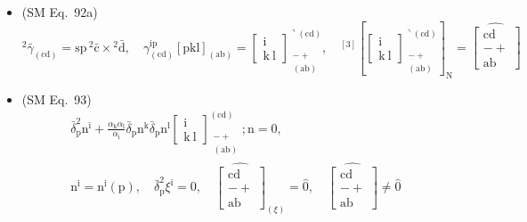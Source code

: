 \documentclass[12pt]{article}
\begin{document}
\begin{itemize}[label={},leftmargin=0pt]
    \item (SM Eq.\ 92a) 
    \[
    {}^2\bar{\gamma}_{(\mathrm{cd})} = \mathrm{sp}\,{}^2\bar{\mathrm{c}} \times {}^2\bar{\mathrm{d}}, \quad \gamma_{(\mathrm{cd})}^{\mathrm{ip}}\left[\mathrm{pkl}\right]_{(\mathrm{ab})} = \left[ \begin{smallmatrix} \mathrm{i} \\ \mathrm{k\ l} \end{smallmatrix} \right]^{\urcorner(\mathrm{cd})}_{\substack{- + \\ (\mathrm{ab})}}, \quad {}^{[3]}\left[ \left[ \begin{smallmatrix} \mathrm{i} \\ \mathrm{k\ l} \end{smallmatrix} \right]^{\urcorner(\mathrm{cd})}_{\substack{- + \\ (\mathrm{ab})}} \right]_\mathrm{N} = \widehat{\left[ \begin{smallmatrix} \mathrm{cd} \\ - + \\ \mathrm{ab} \end{smallmatrix} \right]}
    \]

    \item (SM Eq.\ 93) 
    \[
    \begin{gathered}
    \bar{\delta}_\mathrm{p}^2 \mathrm{n^i} + \frac{\alpha_\mathrm{k} \alpha_\mathrm{l}}{\alpha_\mathrm{i}} \bar{\delta}_\mathrm{p} \mathrm{n^k} \bar{\delta}_\mathrm{p} \mathrm{n^l} \left[ \begin{smallmatrix} \mathrm{i} \\ \mathrm{k\ l} \end{smallmatrix} \right]^{(\mathrm{cd})}_{\substack{- + \\ (\mathrm{ab})}} ; \mathrm{n} = 0, \\
    \mathrm{n^i} = \mathrm{n^i}(\mathrm{p}), \quad \bar{\delta}_\mathrm{p}^2 \xi^\mathrm{i} = 0, \quad \widehat{\left[ \begin{smallmatrix} \mathrm{cd} \\ - + \\ \mathrm{ab} \end{smallmatrix} \right]}_{(\xi)} = \hat{0}, \quad \widehat{\left[ \begin{smallmatrix} \mathrm{cd} \\ - + \\ \mathrm{ab} \end{smallmatrix} \right]} \ne \hat{0}
    \end{gathered}
    \]


\end{itemize}
\end{document}
